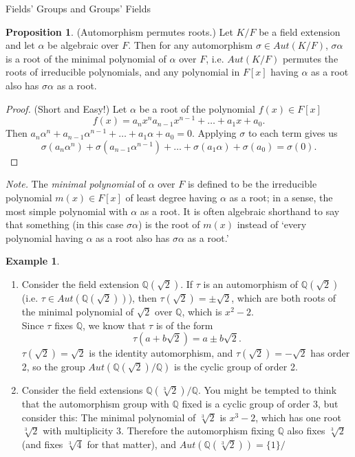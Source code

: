 \documentclass[12pt]{article}
\theoremstyle{definition}
\theoremstyle{definition}
\theoremstyle{definition}
\newtheorem{example}{Example}[section]
\theoremstyle{definition}
\theoremstyle{definition}
\theoremstyle{definition}
\newtheorem{proposition}{Proposition}[section]
\theoremstyle{definition}
\begin{document}
\begin{section}{Fields' Groups and Groups' Fields}
    \begin{proposition}{(Automorphism permutes roots.)}
        Let \(K/F\) be a field extension and let \(\alpha\) be algebraic over \(F\). Then for any automorphism \(\sigma \in Aut(K/F)\), \(\sigma\alpha\) is a root 
        of the minimal polynomial of \(\alpha\) over \(F\), i.e. \(Aut(K/F)\) permutes the roots of irreducible polynomials, and any polynomial in \(F[x]\) having 
        \(\alpha\) as a root also has \(\sigma \alpha\) as a root.
        \begin{proof}{(Short and Easy!)}
            Let \(\alpha\) be a root of the polynomial \(f(x)\in F[x]\)
            \[f(x) = a_n x^n a_{n-1} x^{n-1} + \ldots + a_1 x + a_0.\]
            Then \(a_n \alpha^n + a_{n-1} \alpha^{n-1} + \ldots + a_1 \alpha + a_0=0.\) Applying \(\sigma\) to each term gives us 
            \[\sigma(a_n \alpha^n) + \sigma(a_{n-1} \alpha^{n-1}) + \ldots + \sigma(a_1 \alpha) + \sigma(a_0) = \sigma(0).\]
        \end{proof}
        \noindent\textit{Note.} The \textit{minimal polynomial} of \(\alpha\) over \(F\) is defined to be the irreducible polynomial \(m(x)\in F[x]\) of least degree
        having \(\alpha\) as a root; in a sense, the most simple polynomial with \(\alpha\) as a root. It is often algebraic shorthand to say that something (in this case \(\sigma\alpha\))
        is the root of \(m(x)\) instead of `every polynomial having \(\alpha\) as a root also has \(\sigma\alpha\) as a root.'
    \end{proposition}

    \begin{example}
        \begin{enumerate}
            \item Consider the field extension \(\mathbb{Q}(\sqrt{2})\). If \(\tau\) is an automorphism of \(\mathbb{Q}(\sqrt{2})\) (i.e. \(\tau\in Aut(\mathbb{Q}(\sqrt{2}))\)),
            then \(\tau(\sqrt{2}) = \pm \sqrt{2}\), which are both roots of the minimal polynomial of \(\sqrt{2}\) over \(\mathbb{Q}\), which is \(x^2-2\).\\
            Since \(\tau\) fixes \(\mathbb{Q}\), we know that \(\tau\) is of the form
            \[\tau(a+b\sqrt{2}) = a\pm b\sqrt{2}.\]
            \(\tau(\sqrt{2}) = \sqrt{2}\) is the identity automorphism, and  \(\tau(\sqrt{2}) = -\sqrt{2}\) has order 2, so the group \(Aut(\mathbb{Q}(\sqrt{2})/\mathbb{Q})\)
            is the cyclic group of order 2.

            \item Consider the field extensions \(\mathbb{Q}(\sqrt[3]{2})/\mathbb{Q}\). You might be tempted to think that the automorphism group with \(\mathbb{Q}\) fixed is a cyclic group of order 3, but consider this:
            The minimal polynomial of \(\sqrt[3]{2}\) is \(x^3-2\), which has one root \(\sqrt[3]{2}\) with multiplicity 3. Therefore the automorphism fixing \(\mathbb{Q}\) also fixes \(\sqrt[3]{2}\) (and fixes 
            \(\sqrt[3]{4}\) for that matter), and \(Aut(\mathbb{Q}(\sqrt[3]{2})) = \{1\}/\)
        \end{enumerate}
    \end{example}


\end{section}
\end{document}
